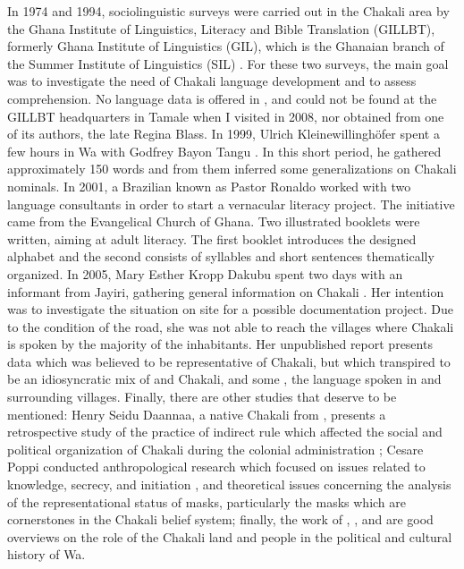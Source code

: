 \newpage 
In 
1974 and 1994, sociolinguistic surveys were carried out in the Chakali area by 
the Ghana Institute of Linguistics, Literacy and Bible Translation (GILLBT), 
formerly Ghana Institute of Linguistics (GIL), which is the Ghanaian branch of 
the Summer Institute of Linguistics (SIL) \citep{Reim75, Tomp02}. For these two 
surveys, the main goal  was to investigate the need of Chakali language 
development and to assess   comprehension. No language data is offered in 
  \citet{Tomp02}, and \citet{Reim75}  could not be found at the 
GILLBT headquarters in Tamale when I visited in 2008, nor obtained from one of its authors, the late 
Regina Blass.  In 1999, Ulrich Kleinewillinghöfer spent a few hours in Wa 
with Godfrey Bayon Tangu \citep{Klei99}. In this short period,  he  gathered 
approximately 150 words  and from them  inferred some generalizations on Chakali 
nominals. In 2001, a Brazilian  known as Pastor Ronaldo worked with two  
language consultants in order to start a vernacular literacy project. The 
initiative came from the Evangelical Church of Ghana.  Two illustrated booklets 
were written,  aiming at adult literacy.  The first 
booklet introduces the designed alphabet  and the second  
consists of  syllables and short sentences thematically organized. In 2005, 
 Mary Esther Kropp Dakubu spent two  days with an informant from Jayiri, 
gathering general information on Chakali  \citep{Daku05}. Her intention was to 
investigate the situation on site for a possible documentation project. Due to 
the condition of the road, she was not able to reach the villages where Chakali is spoken by the majority of the inhabitants.  Her unpublished report  presents  data which was believed to be representative of  Chakali, but which transpired to be an idiosyncratic mix of  and Chakali, and some ,  the language spoken in  and surrounding villages. Finally, there are other studies that deserve to be mentioned:  Henry Seidu Daannaa,   a native Chakali from ,  presents a retrospective study of the practice of indirect rule  which affected the social and political organization of  Chakali during the colonial administration \citep{Daan94};    Cesare Poppi conducted anthropological research which focused on issues related to knowledge, secrecy,  and initiation \citep{Popp93}, and  theoretical issues concerning the analysis of the representational status of masks, particularly the {\it {}} masks which are cornerstones in the  Chakali belief system; finally, the work of \citet{Doug66},  \citet{Wilk89}, and \citet{Sali08}  are good  overviews on the role of the Chakali land and people in the  political and cultural history of Wa.

